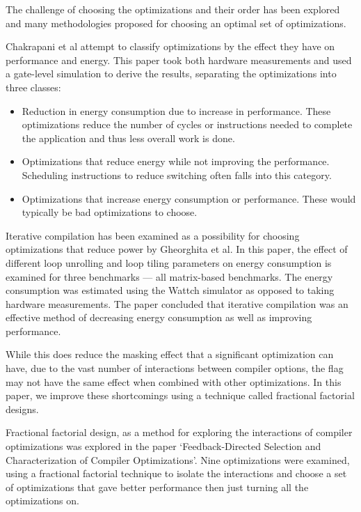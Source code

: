\documentclass[twocolumn]{article}
\begin{document}
The challenge of choosing the optimizations and their order has been explored and many methodologies proposed for choosing an optimal set of optimizations.

Chakrapani et al attempt to classify optimizations by the effect they have on performance and energy\cite{WhatCanAPoorCompilerDo}. This paper took both hardware measurements and used a gate-level simulation to derive the results, separating the optimizations into three classes:
\begin{itemize}
	\setlength{\itemsep}{0em}
	\vspace{-1mm}
	\item Reduction in energy consumption due to increase in performance. These optimizations reduce the number of cycles or instructions needed to complete the application and thus less overall work is done.
	\item Optimizations that reduce energy while not improving the performance. Scheduling instructions to reduce switching often falls into this category.
	\item Optimizations that increase energy consumption or performance. These would typically be bad optimizations to choose.
\end{itemize}

Iterative compilation has been examined as a possibility for choosing optimizations that reduce power by Gheorghita et al\cite{IterativeCompilationForEnergy}. In this paper, the effect of different loop unrolling and loop tiling parameters on energy consumption is examined for three benchmarks --- all matrix-based benchmarks. The energy consumption was estimated using the Wattch simulator as opposed to taking hardware measurements. The paper concluded that iterative compilation was an effective method of decreasing energy consumption as well as improving performance.


While this does reduce the masking effect that a significant optimization can have, due to the vast number of interactions between compiler options, the flag may not have the same effect when combined with other optimizations. In this paper, we improve these shortcomings using a technique called fractional factorial designs.

Fractional factorial design, as a method for exploring the interactions of compiler optimizations was explored in the paper `Feedback-Directed Selection and Characterization of Compiler Optimizations'\cite{IntelPaper}. Nine optimizations were examined, using a fractional factorial technique to isolate the interactions and choose a set of optimizations that gave better performance then just turning all the optimizations on.
\end{document}
